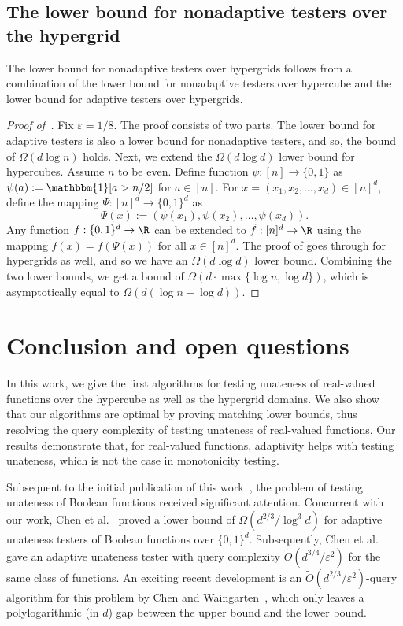 \documentclass{toc}
\newcommand{\eps}{\varepsilon}
\newcommand{\Thm}[1]{\expref{Theorem}{thm:#1}}
\begin{document}
\subsection{The lower bound for nonadaptive testers over the hypergrid}\label{sec:na-lb-hg}
The lower bound for nonadaptive testers over hypergrids follows from a combination of the lower bound for nonadaptive testers over hypercube and the lower bound for adaptive testers over hypergrids.

\begin{proof}[Proof of~\Thm{na-lb-hg}]
Fix $\eps = 1/8$. The proof consists of two parts. The lower bound for adaptive testers is also a lower bound for nonadaptive 
testers, %
and so, the bound of $\Omega(d \log n)$ holds.
Next, we extend the $\Omega(d \log d)$ lower bound for hypercubes.
Assume $n$ to be even. Define function $\psi:[n] \to \{0,1\}$ as $\psi(a):= \mathbbm{1}[a > n/2]$ for $a \in [n]$. For $x = (x_1, x_2, \ldots, x_d) \in [n]^d$, define the mapping $\Psi: [n]^d \to \{0,1\}^d$ as
\[\Psi(x) := (\psi(x_1), \psi(x_2), \ldots, \psi(x_d)).\]
Any function $f:\{0,1\}^d \to \R$ can be extended to $\tilde{f}:[n]^d \to \R$ using the mapping $\tilde{f}(x) = f(\Psi(x))$ for all $x \in [n]^d$. The proof of \Thm{non-adap-lb} goes through for hypergrids as well, and so we have an $\Omega(d \log d)$ lower bound. Combining the two lower bounds, we get a bound of $\Omega(d \cdot \max\{\log n, \log d\})$, which is asymptotically equal to $\Omega(d(\log n + \log d))$.
\end{proof}

\section{Conclusion and open questions}
In this work, we give the first algorithms for
testing unateness of real-valued functions over the hypercube as well as the hypergrid domains.
We also show that our algorithms are optimal by proving matching lower bounds, thus resolving the query complexity of testing unateness of real-valued functions.
Our results demonstrate that, for real-valued functions, adaptivity helps with testing unateness, which is not the case in monotonicity testing.

%

Subsequent to the initial publication of this work~\cite{BCPRS17a}, the problem of testing unateness of Boolean functions received significant attention.
Concurrent with our work, Chen et al.~\cite{CWX17} proved a lower bound of $\Omega\left({d^{2/3}}/{\log^3 d} \right)$ for adaptive unateness testers of Boolean functions over $\{0,1\}^d$.
Subsequently, Chen et al.~\cite{CWX17focs} gave an adaptive unateness tester with query complexity $\widetilde{O}\left({d^{3/4}}/{\eps^2}\right)$ for the same class of functions.
An exciting recent development is an $\widetilde{O}\left({d^{2/3}}/{\eps^2}\right)$-query algorithm for this problem by Chen and Waingarten~\cite{CW19}, which only leaves a polylogarithmic (in $d$) gap between the upper bound and the lower bound.
%
\end{document}
